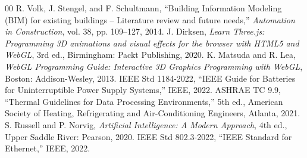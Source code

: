\documentclass[conference]{IEEEtran}
\begin{document}
\begin{thebibliography}{00}
 R. Volk, J. Stengel, and F. Schultmann, ``Building Information Modeling (BIM) for existing buildings -- Literature review and future needs,'' \textit{Automation in Construction}, vol. 38, pp. 109--127, 2014.
 J. Dirksen, \textit{Learn Three.js: Programming 3D animations and visual effects for the browser with HTML5 and WebGL}, 3rd ed., Birmingham: Packt Publishing, 2020.
 K. Matsuda and R. Lea, \textit{WebGL Programming Guide: Interactive 3D Graphics Programming with WebGL}, Boston: Addison-Wesley, 2013.
 IEEE Std 1184-2022, ``IEEE Guide for Batteries for Uninterruptible Power Supply Systems,'' IEEE, 2022.
 ASHRAE TC 9.9, ``Thermal Guidelines for Data Processing Environments,'' 5th ed., American Society of Heating, Refrigerating and Air-Conditioning Engineers, Atlanta, 2021.
 S. Russell and P. Norvig, \textit{Artificial Intelligence: A Modern Approach}, 4th ed., Upper Saddle River: Pearson, 2020.
 IEEE Std 802.3-2022, ``IEEE Standard for Ethernet,'' IEEE, 2022.
\end{thebibliography}
\end{document}
